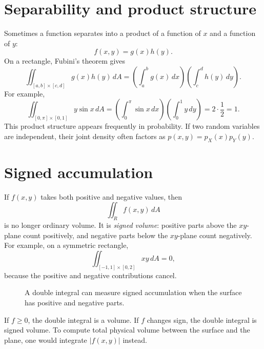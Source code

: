 \documentclass[11pt]{article}
\newcommand{\dA}{\,dA}
\newcommand{\dd}{\,d}
\begin{document}
\section{Separability and product structure}

Sometimes a function separates into a product of a function of $x$ and a function of $y$:
\[
f(x,y)=g(x)h(y).
\]
On a rectangle, Fubini's theorem gives
\[
\iint_{[a,b]\times[c,d]}g(x)h(y)\dA=\left(\int_a^b g(x)\dd x\right)\left(\int_c^d h(y)\dd y\right).
\]
For example,
\[
\iint_{[0,\pi]\times[0,1]}y\sin x\dA=\left(\int_0^\pi\sin x\dd x\right)\left(\int_0^1y\dd y\right)=2\cdot\frac12=1.
\]
This product structure appears frequently in probability. If two random variables are independent, their joint density often factors as $p(x,y)=p_X(x)p_Y(y)$.

\section{Signed accumulation}

If $f(x,y)$ takes both positive and negative values, then
\[
\iint_R f(x,y)\dA
\]
is no longer ordinary volume. It is \emph{signed volume}: positive parts above the $xy$-plane count positively, and negative parts below the $xy$-plane count negatively. For example, on a symmetric rectangle,
\[
\iint_{[-1,1]\times[0,2]}xy\dA=0,
\]
because the positive and negative contributions cancel.

\begin{figure}[H]
\centering
{}
\caption{A double integral can measure signed accumulation when the surface has positive and negative parts.}
\end{figure}

\begin{warningbox}
If $f\ge 0$, the double integral is a volume. If $f$ changes sign, the double integral is signed volume. To compute total physical volume between the surface and the plane, one would integrate $|f(x,y)|$ instead.
\end{warningbox}
\end{document}
